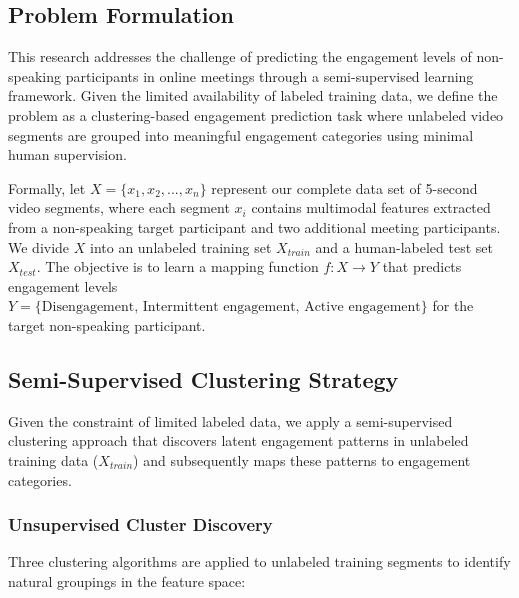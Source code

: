 \documentclass[
]{ceurart}
\begin{document}
\subsection{Problem Formulation}
This research addresses the challenge of predicting the engagement levels of non-speaking participants in online meetings through a semi-supervised learning framework. Given the limited availability of labeled training data, we define the problem as a clustering-based engagement prediction task where unlabeled video segments are grouped into meaningful engagement categories using minimal human supervision.

Formally, let $X = \{x_1, x_2, ..., x_n\}$ represent our complete data set of 5-second video segments, where each segment $x_i$ contains multimodal features extracted from a non-speaking target participant and two additional meeting participants. We divide $X$ into an unlabeled training set $X_{train}$ and a human-labeled test set $X_{test}$. The objective is to learn a mapping function $f: X \rightarrow Y$ that predicts engagement levels $Y = \{\text{Disengagement, Intermittent engagement, Active engagement}\}$ for the target non-speaking participant.

\subsection{Semi-Supervised Clustering Strategy}
Given the constraint of limited labeled data, we apply a semi-supervised clustering approach that discovers latent engagement patterns in unlabeled training data ($X_{train}$) and subsequently maps these patterns to engagement categories.

\subsubsection{Unsupervised Cluster Discovery}
Three clustering algorithms are applied to unlabeled training segments to identify natural groupings in the feature space:
\end{document}
